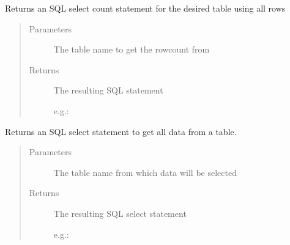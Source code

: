 \documentclass[letterpaper,10pt,english]{sphinxmanual}
\begin{document}
\begin{fulllineitems}
\begin{fulllineitems}
\end{fulllineitems}


\begin{fulllineitems}
\label{\detokenize{src:src.Database.DatabaseStatements.getOverallCountStatement}}
Returns an SQL select count statement for the desired table using all rows
\begin{quote}\begin{description}
\item[{Parameters}] \leavevmode
{} \textendash{} The table name to get the rowcount from

\item[{Returns}] \leavevmode

The resulting SQL statement

e.g.: 


\end{description}\end{quote}

\end{fulllineitems}


\begin{fulllineitems}
\label{\detokenize{src:src.Database.DatabaseStatements.getSelectAllStatement}}
Returns an SQL select statement to get all data from a table.
\begin{quote}\begin{description}
\item[{Parameters}] \leavevmode
{} \textendash{} The table name from which data will be selected

\item[{Returns}] \leavevmode

The resulting SQL select statement

e.g.: 


\end{description}\end{quote}

\end{fulllineitems}


\end{fulllineitems}
\end{document}
